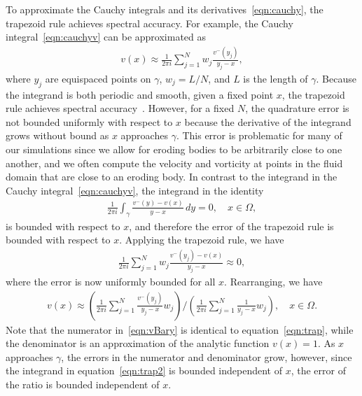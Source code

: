\documentclass[3p]{elsarticle}
\begin{document}
To approximate the Cauchy integrals and its
derivatives~\eqref{eqn:cauchy}, the trapezoid rule achieves spectral
accuracy. For example, the Cauchy integral~\eqref{eqn:cauchyv} can be
approximated as
\begin{align}
  v(x) \approx \frac{1}{2\pi i} \sum_{j=1}^{N} 
    w_j \frac{v^{-}(y_j)}{y_j - x},
  \label{eqn:trap}
\end{align}
where $y_j$ are equispaced points on $\gamma$, $w_j = L/N$, and $L$ is
the length of $\gamma$. Because the integrand is both periodic and
smooth, given a fixed point $x$, the trapezoid rule achieves spectral
accuracy~\cite{tre-wei2014}. However, for a fixed $N$, the quadrature
error is not bounded uniformly with respect to $x$ because the
derivative of the integrand grows without bound as $x$ approaches
$\gamma$. This error is problematic for many of our simulations since we
allow for eroding bodies to be arbitrarily close to one another, and we
often compute the velocity and vorticity at points in the fluid domain
that are close to an eroding body. In contrast to the integrand in the
Cauchy integral~\eqref{eqn:cauchyv}, the integrand in the identity
\begin{align}
  \frac{1}{2\pi i}\int_{\gamma} 
    \frac{v^{-}(y) - v(x)}{y-x} \, dy = 0, \quad x \in \Omega,
  \label{eqn:trap2}
\end{align}
is bounded with respect to $x$, and therefore the error of the trapezoid
rule is bounded with respect to $x$. Applying the trapezoid rule, we
have
\begin{align}
  \frac{1}{2\pi i}\sum_{j=1}^{N} w_{j} 
    \frac{v^{-}(y_j) - v(x)}{y_j - x} \approx 0,
\end{align}
where the error is now uniformly bounded for all $x$. Rearranging, we
have
\begin{align}
  v(x) \approx \left(\frac{1}{2\pi i}\sum_{j=1}^N 
    \frac{v^{-}(y_j)}{y_j - x} w_j \right) \Bigg/
  \left(\frac{1}{2\pi i}\sum_{j=1}^N \frac{1}{y_j - x} w_j \right), 
  \quad x \in \Omega.
  \label{eqn:vBary}
\end{align}
Note that the numerator in~\eqref{eqn:vBary} is identical to
equation~\eqref{eqn:trap}, while the denominator is an approximation of
the analytic function $v(x) = 1$. As $x$ approaches $\gamma$, the errors
in the numerator and denominator grow, however, since the integrand in
equation~\eqref{eqn:trap2} is bounded independent of $x$, the error of
the ratio is bounded independent of $x$.
\end{document}
